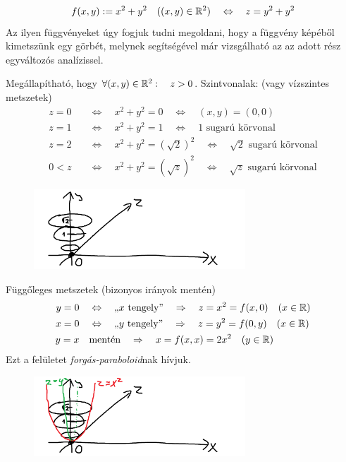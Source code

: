\documentclass[a4paper,11.5pt]{article}
\begin{document}
	\begin{task}
		\[ f(x,y):=x^2+y^2\quad ((x,y)\in\mathbb{R}^2)\quad \Leftrightarrow\quad z=y^2+y^2 \]
		Az ilyen függvényeket úgy fogjuk tudni megoldani, hogy a függvény képéből kimetszünk egy görbét, melynek segítségével már vizsgálható az az adott rész egyváltozós analízissel.
		
		\medskip
		Megállapítható, hogy $\forall (x,y)\in\mathbb{R}^2:\quad z>0$.
		\smallskip
		Szintvonalak: (vagy vízszintes metszetek)
		\begin{align*}
			z=0&\quad \Leftrightarrow\quad x^2+y^2=0\quad \Leftrightarrow\quad (x,y)=(0,0) \\
			z=1&\quad \Leftrightarrow\quad x^2+y^2=1\quad \Leftrightarrow\quad \text{1 sugarú körvonal} \\
			z=2&\quad \Leftrightarrow\quad x^2+y^2=(\sqrt{2})^2\quad \Leftrightarrow\quad \text{$\sqrt{2}$ sugarú körvonal} \\
			0<z&\quad \Leftrightarrow\quad x^2+y^2=(\sqrt{z})^2\quad \Leftrightarrow\quad \sqrt{z}\text{ sugarú körvonal} 
		\end{align*}
		\begin{figure}[H]
			\centering
			\includegraphics[height=3cm]{kepek/18.png}
			\caption{}
		\end{figure}
		Függőleges metszetek (bizonyos irányok mentén)
		\begin{align*}
			y=0&\quad \Leftrightarrow\quad \text{,,$x$ tengely''}\quad \Rightarrow\quad z=x^2=f(x,0)\quad (x\in\mathbb{R}) \\
			x=0&\quad \Leftrightarrow\quad \text{,,$y$ tengely''}\quad \Rightarrow\quad z=y^2=f(0,y)\quad (x\in\mathbb{R}) \\
			y=x&\quad \text{mentén}\quad \Rightarrow\quad x=f(x,x)=2x^2\quad (y\in\mathbb{R}) 
		\end{align*}
		Ezt a felületet \textit{forgás-paraboloid}nak hívjuk.
		\begin{figure}[H]
			\centering
			\includegraphics[height=3cm]{kepek/19.png}
			\caption{}
		\end{figure}
	\end{task}
\end{document}
